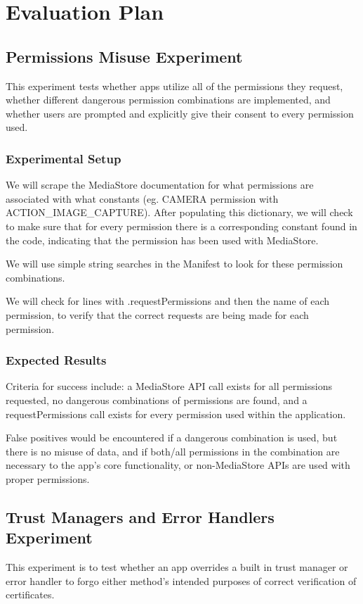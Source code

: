 \documentclass[10pt,twocolumn,pdftex]{article}
\begin{document}
\section{Evaluation Plan}


\subsection{Permissions Misuse Experiment}

    This experiment tests whether apps utilize all of the permissions they request, whether different dangerous permission combinations are implemented, and whether users are prompted and explicitly give their consent to every permission used.

    \subsubsection{Experimental Setup}
    We will scrape the MediaStore documentation for what permissions are associated with what constants (eg. CAMERA permission with ACTION\_IMAGE\_CAPTURE). After populating this dictionary, we will check to make sure that for every permission there is a corresponding constant found in the code, indicating that the permission has been used with MediaStore.

    We will use simple string searches in the Manifest to look for these permission combinations. 

    We will check for lines with .requestPermissions and then the name of each permission, to verify that the correct requests are being made for each permission.

    \subsubsection{Expected Results}

    Criteria for success include:
    a MediaStore API call exists for all permissions requested, 
    no dangerous combinations of permissions are found, and
    a requestPermissions call exists for every permission used within the application.

    False positives would be encountered if
    a dangerous combination is used, but there is no misuse of data, and if both/all permissions in the combination are necessary to the app’s core functionality, or 
    non-MediaStore APIs are used with proper permissions.


\subsection{Trust Managers and Error Handlers Experiment}
    This experiment is to test whether an app overrides a built in trust manager or error handler to forgo either method's intended purposes of correct verification of certificates. 
\end{document}
